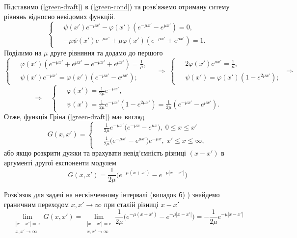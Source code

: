 Підставимо (\ref{green-draft}) в (\ref{green-cond}) та розв'яжемо отриману ситему рівнянь відносно невідомих функцій.
\begin{equation} 
    \left\{ \begin{aligned}
        \;& \psi(x') e^{-\mu x'} - \varphi(x') (e^{-\mu x'} - e^{\mu x'}) = 0,\\
          & -\mu \psi(x') e^{-\mu x'} + \mu \varphi(x') (e^{-\mu x'} + e^{\mu x'}) = 1.
    \end{aligned} \right.
\end{equation}
Поділимо на $\mu$ друге рівняння та додамо до першого
\begin{equation*} 
    \left\{ \begin{aligned}
        \;& \varphi(x') (e^{-\mu x'} + e^{\mu x'} - e^{-\mu x'} + e^{\mu x'}) = \frac{1}{\mu},\\
          & \psi(x') e^{-\mu x'} = \varphi(x') (e^{-\mu x'} - e^{\mu x'});
    \end{aligned} \right.
    \quad\Rightarrow\;
    \left\{ \begin{aligned}
        \;& 2\varphi(x') e^{\mu x'} = \frac{1}{\mu},\\
          & \psi(x')  = \varphi(x') (1 - e^{2\mu x'});
    \end{aligned} \right.
    \;\Rightarrow
\end{equation*}
\begin{equation*} 
    \Rightarrow\quad
    \left\{ \begin{aligned}
        \;& \varphi(x') = \frac{1}{2\mu}e^{-\mu x'},\\
          & \psi(x')  = \frac{1}{2\mu}e^{-\mu x'} (1 - e^{2\mu x'}) = \frac{1}{2\mu} (e^{-\mu x'} - e^{\mu x'}).
    \end{aligned} \right.
\end{equation*}
Отже, функція Гріна (\ref{green-draft}) має вигляд
\begin{equation} 
    G(x,x') = 
    \left\{ \begin{aligned}
        \;& \frac{1}{2\mu}e^{-\mu x'} \big( e^{-\mu x} - e^{\mu x} \big), \; 0 \leq x \leq x' \\
          & \frac{1}{2\mu} \big(e^{-\mu x'} - e^{\mu x'}\big) e^{-\mu x}, \; x' \leq x \leq \infty,
    \end{aligned} \right.
\end{equation}
або якщо розкрити дужки та врахувати невід'ємність різниці $(x - x')$ в аргументі другої експоненти модулем
\begin{equation} 
    G(x,x') = \frac{1}{2\mu} \big( e^{-\mu (x + x')} - e^{-\mu |x - x'|} \big)
\end{equation}

Розв'язок для задачі на нескінченному інтервалі (випадок б) ) знайдемо граничним переходом $x, x' \to \infty$ при сталій різниці $x - x'$
\begin{equation}
    \lim_{\substack{|x-x'| = \mathrm{c}\\ x,x'\to\infty}} G(x,x') = \lim_{\substack{|x-x'| = \mathrm{c}\\ x,x'\to\infty}} \frac{1}{2\mu} \big( e^{-\mu (x + x')} - e^{-\mu |x - x'|} \big) = -\frac{1}{2\mu} e^{-\mu |x - x'|}
\end{equation}  

%